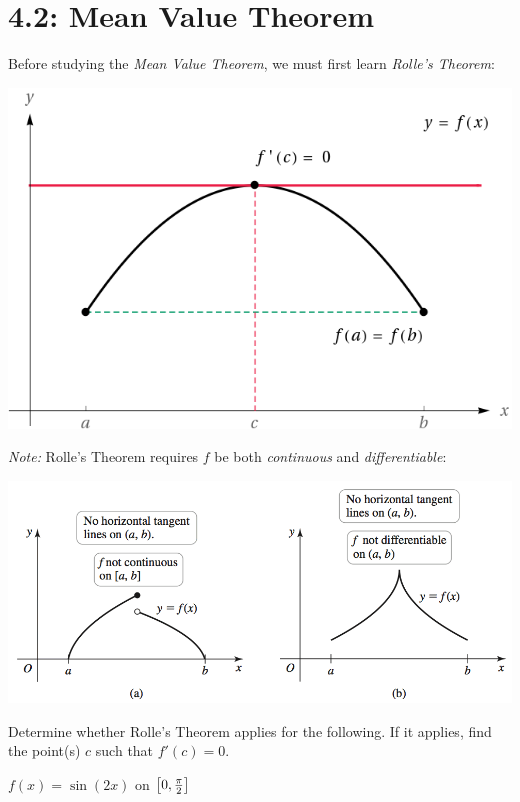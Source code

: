 \documentclass[answers]{exam}
\begin{document}
\section{4.2: Mean Value Theorem}
Before studying the \textit{Mean Value Theorem}, we must first learn \textit{Rolle's Theorem}:\\

\noindent
{}

\begin{center}
  \includegraphics[width=0.3\linewidth]{images/briggs_04_02/RollesThm01.png}
\end{center}

\textit{Note:} Rolle's Theorem requires $f$ be both \textit{continuous} and \textit{differentiable}:
\begin{center}
  \includegraphics[width=0.6\linewidth]{images/briggs_04_02/RollesThm02.png}
\end{center}

\begin{ex*}
  Determine whether Rolle's Theorem applies for the following. If it applies, find the point(s) $c$ such that $f'(c)=0$.
\end{ex*}
$f(x)=\sin(2x)$ on ${\left[0, \frac{\pi}{2}\right]}$
\pagebreak

\noindent
{}
\end{document}
